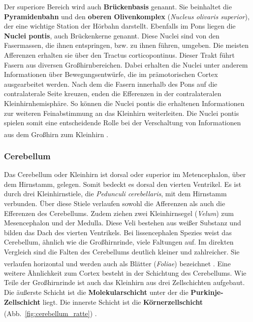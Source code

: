 \documentclass[12pt,a4paper,pdftex]{article}
\begin{document}
\noindent Der superiore Bereich wird auch \textbf{Brückenbasis} genannt. Sie beinhaltet die \textbf{Pyramidenbahn} und den \textbf{oberen Olivenkomplex} (\textit{Nucleus olivaris superior}), der eine wichtige Station der Hörbahn darstellt. Ebenfalls im Pons liegen die \textbf{Nuclei pontis}, auch Brückenkerne genannt. Diese Nuclei sind von den Fasermassen, die ihnen entspringen, bzw. zu ihnen führen, umgeben. Die meisten Afferenzen erhalten sie über den Tractus corticopontinus. Dieser Trakt führt Fasern aus diversen Großhirnbereichen. Dabei erhalten die Nuclei unter anderem Informationen über Bewegungsentwürfe, die im prämotorischen Cortex ausgearbeitet werden. Nach dem die Fasern innerhalb des Pons auf die contralaterale Seite kreuzen, enden die Efferenzen in der contralateralen Kleinhirnhemisphäre. So können die Nuclei pontis die erhaltenen Informationen zur weiteren Feinabstimmung an das Kleinhirn weiterleiten. Die Nuclei pontis spielen somit eine entscheidende Rolle  bei der Verschaltung von Informationen aus dem Großhirn zum Kleinhirn \textsuperscript{\cite[5]{trepel2011neuroanatomie}}.

\subsubsection{Cerebellum}
\label{subsubsec:Cerebellum} 

Das Cerebellum oder Kleinhirn ist dorsal oder superior im Metencephalon, über dem Hirnstamm, gelegen. Somit bedeckt es dorsal den vierten Ventrikel. Es ist durch drei Kleinhirnstiele, die \textit{Pedunculi cerebellaris}, mit dem Hirnstamm verbunden. Über diese Stiele verlaufen sowohl die Afferenzen als auch die Efferenzen des Cerebellums. Zudem ziehen zwei Kleinhirnsegel (\textit{Velum}) zum Mesencephalon und der Medulla. Diese Veli bestehen aus weißer Substanz und bilden das Dach des vierten Ventrikels. Bei lissencephalen Spezies weist das Cerebellum, ähnlich wie die Großhirnrinde, viele Faltungen auf. Im direkten Vergleich sind die Falten des Cerebellums deutlich kleiner und zahlreicher. Sie verlaufen horizontal und werden auch als Blätter (\textit{Foliae}) bezeichnet \textsuperscript{\cite[7]{trepel2011neuroanatomie}}. Eine weitere Ähnlichkeit zum Cortex besteht in der Schichtung des Cerebellums. Wie Teile der  Großhirnrinde ist auch das Kleinhirn aus drei Zellschichten aufgebaut. Die äußerste Schicht ist die \textbf{Molekularschicht} unter der die \textbf{Purkinje-Zellschicht} liegt. Die innerste Schicht ist die \textbf{Körnerzellschicht} (Abb.~\ref{fig:cerebellum_ratte}) \textsuperscript{\cite[14]{penzlin2005tierphys}}.
\end{document}
